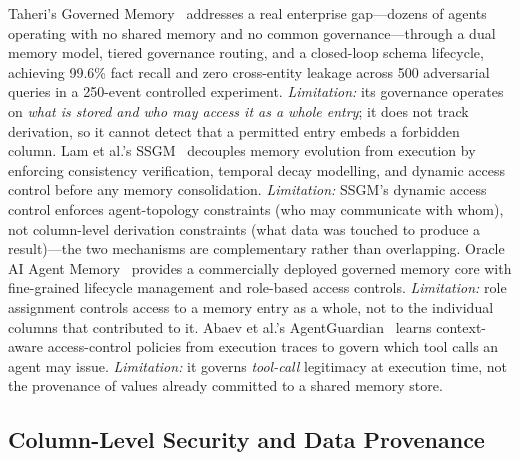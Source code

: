 \documentclass[9pt,twocolumn,twoside]{extarticle}
\begin{document}
Taheri's Governed Memory~\cite{taheri2026governed} addresses a real enterprise
gap---dozens of agents operating with no shared memory and no common
governance---through a dual memory model, tiered governance routing, and a
closed-loop schema lifecycle, achieving 99.6\% fact recall and zero
cross-entity leakage across 500 adversarial queries in a 250-event controlled
experiment.
\emph{Limitation:} its governance operates on \emph{what is stored and who may
access it as a whole entry}; it does not track derivation, so it cannot detect
that a permitted entry embeds a forbidden column.
Lam et al.'s SSGM~\cite{lam2026ssgm} decouples memory evolution from execution
by enforcing consistency verification, temporal decay modelling, and dynamic
access control before any memory consolidation.
\emph{Limitation:} SSGM's dynamic access control enforces agent-topology
constraints (who may communicate with whom), not column-level derivation
constraints (what data was touched to produce a result)---the two mechanisms
are complementary rather than overlapping.
Oracle AI Agent Memory~\cite{oracle2026memory} provides a commercially
deployed governed memory core with fine-grained lifecycle management and
role-based access controls.
\emph{Limitation:} role assignment controls access to a memory entry as a
whole, not to the individual columns that contributed to it.
Abaev et al.'s AgentGuardian~\cite{abaev2026agentguardian} learns
context-aware access-control policies from execution traces to govern which
tool calls an agent may issue.
\emph{Limitation:} it governs \emph{tool-call} legitimacy at execution time,
not the provenance of values already committed to a shared memory store.

\subsection{Column-Level Security and Data Provenance}
\end{document}
